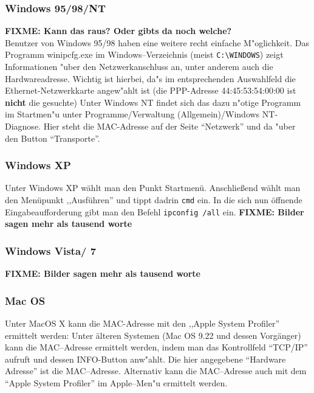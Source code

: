 \documentclass[12pt,titlepage,twoside]{scrartcl}
\begin{document}
\subsubsection*{Windows 95/98/NT}
\textbf{FIXME: Kann das raus? Oder gibts da noch welche?}\\
Benutzer von Windows 95/98 haben  eine weitere recht einfache
M"oglichkeit. Das Programm winipcfg.exe im Windows--Verzeichnis (meist
\verb#C:\WINDOWS#) zeigt Informationen "uber den Netzwerkanschluss
an, unter anderem auch die Hardwareadresse. Wichtig ist hierbei, da"s im
entsprechenden Auswahlfeld die Ethernet-Netzwerkkarte angew"ahlt ist (die
PPP-Adresse 44:45:53:54:00:00 ist \textbf{nicht} die gesuchte)
Unter Windows NT findet sich das dazu n"otige Programm im Startmen"u unter
Programme/Verwaltung (Allgemein)/Windows NT-Diagnose. Hier steht die
MAC-Adresse auf der Seite "`Netzwerk"' und da "uber den Button "`Transporte"'.

\subsubsection*{Windows XP}
Unter Windows XP wählt man den Punkt Startmenü. Anschließend wählt man
den Menüpunkt ,,Ausführen'' und tippt dadrin \texttt{cmd} ein. In die sich
nun öffnende Eingabeaufforderung gibt man den Befehl \texttt{ipconfig /all}
ein. %
\textbf{FIXME: Bilder sagen mehr als tausend worte}

\subsubsection*{Windows Vista/ 7}

\textbf{FIXME: Bilder sagen mehr als tausend worte}


\subsubsection*{Mac OS}

Unter MacOS X kann die MAC-Adresse mit den ,,Apple System Profiler''
ermittelt werden: %
Unter älteren Systemen (Mac OS 9.22 und dessen Vorgänger) kann 
die MAC--Adresse ermittelt werden, indem man das
Kontrollfeld "`TCP/IP"' aufruft und dessen INFO-Button anw"ahlt. Die hier
angegebene "`Hardware Adresse"' ist die MAC--Adresse. Alternativ kann die
MAC--Adresse auch mit dem "`Apple System Profiler"' im Apple--Men"u ermittelt
werden. 
\end{document}
